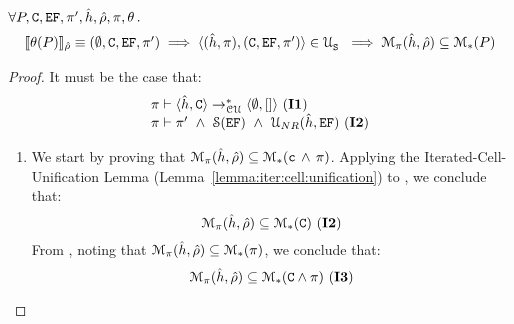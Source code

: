\begin{temax}
$\forall P, \mathtt{C}, \mathtt{EF}, \pi',  \hat{h}, \hat\rho, \pi, \theta \, .$
$$
\begin{array}{l}
\llbracket \theta(P) \rrbracket_{\hat\rho} \equiv (\emptyset, \mathtt{C}, \mathtt{EF}, \pi')\implies\langle (\hat{h}, \pi), (\mathtt{C}, \mathtt{EF}, \pi') \rangle \in {\cal U}_{\mathtt{S}}^{} \
    \implies \mathcal{M}_{\pi}(\hat{h}, \hat\rho) \subseteq \mathcal{M}_{*}(P)   
\end{array}
$$ 
\end{temax}
\begin{proof}
It must be the case that: 
$$
\begin{array}{l}
\cellunificationiter{\sheap, \cells}{\hemp, []}{\pc} \text{ (\ieq{1})} \\
%
\pc \vdash \pfs' \ \wedge \ \sanity{\efs} \ \wedge \  \unificationef{\sheap}{\efs} \text{ (\ieq{2})}
\end{array}
$$

\begin{enumerate}

\item We start by proving that $\mathcal{M}_{\pi}(\hat{h}, \hat\rho) \subseteq \mathcal{M}_{*}(\mathtt{c} \, \wedge \, \pi)$. 
Applying the Iterated-Cell-Unification Lemma (Lemma~\ref{lemma:iter:cell:unification}) to \ieq{1}, 
we conclude that: 
$$
  \mathcal{M}_{\pi}(\hat{h}, \hat\rho) \subseteq \mathcal{M}_{*}(\mathtt{C}) \text{ ({\bf I2})}
$$  
From , noting that $\mathcal{M}_{\pi}(\hat{h}, \hat\rho) \subseteq \mathcal{M}_{*}(\pi)$, 
we conclude that: 
$$
\mathcal{M}_{\pi}(\hat{h}, \hat\rho) \subseteq \mathcal{M}_{*}(\mathtt{C} \wedge \pi) \text{ ({\bf I3})}
$$  


\end{enumerate}
\end{proof}

